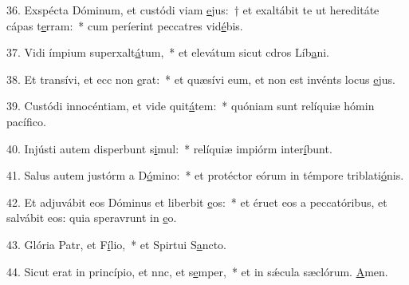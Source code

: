 36. Exspécta Dóminum, et custódi viam \uline{e}jus:~† et exaltábit te ut hereditáte cápas t\uline{e}rram:~* cum períerint peccatres vid\uline{é}bis.\par 
37. Vidi ímpium superxalt\uline{á}tum,~* et elevátum sicut cdros Líb\uline{a}ni.\par 
38. Et transívi, et ecc non \uline{e}rat:~* et quæsívi eum, et non est invénts locus \uline{e}jus.\par 
39. Custódi innocéntiam, et vide quit\uline{á}tem:~* quóniam sunt relíquiæ hómin pacíf\uline{i}co.\par 
40. Injústi autem disperbunt s\uline{i}mul:~* relíquiæ impiórm inter\uline{í}bunt.\par 
41. Salus autem justórm a D\uline{ó}mino:~* et protéctor eórum in témpore triblati\uline{ó}nis.\par 
42. Et adjuvábit eos Dóminus et liberbit \uline{e}os:~* et éruet eos a peccatóribus, et salvábit eos: quia speravrunt in \uline{e}o.\par 
43. Glória Patr, et F\uline{í}lio,~* et Spirtui S\uline{a}ncto.\par 
44. Sicut erat in princípio, et nnc, et s\uline{e}mper,~* et in sǽcula sæclórum. \uline{A}men.\par 

